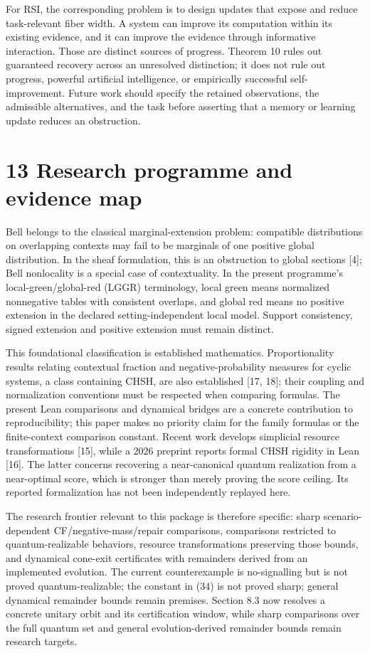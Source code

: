 \documentclass[
]{article}
\begin{document}
For RSI, the corresponding problem is to design updates that expose and reduce task-relevant fiber width. A system can improve its computation within its existing evidence, and it can improve the evidence through informative interaction. Those are distinct sources of progress. Theorem 10 rules out guaranteed recovery across an unresolved distinction; it does not rule out progress, powerful artificial intelligence, or empirically successful self-improvement. Future work should specify the retained observations, the admissible alternatives, and the task before asserting that a memory or learning update reduces an obstruction.

\section{13 Research programme and evidence map}\label{research-programme-and-evidence-map}

Bell belongs to the classical marginal-extension problem: compatible distributions on overlapping contexts may fail to be marginals of one positive global distribution. In the sheaf formulation, this is an obstruction to global sections {[}4{]}; Bell nonlocality is a special case of contextuality. In the present programme's local-green/global-red (LGGR) terminology, local green means normalized nonnegative tables with consistent overlaps, and global red means no positive extension in the declared setting-independent local model. Support consistency, signed extension and positive extension must remain distinct.

This foundational classification is established mathematics. Proportionality results relating contextual fraction and negative-probability measures for cyclic systems, a class containing CHSH, are also established {[}17, 18{]}; their coupling and normalization conventions must be respected when comparing formulas. The present Lean comparisons and dynamical bridges are a concrete contribution to reproducibility; this paper makes no priority claim for the family formulas or the finite-context comparison constant. Recent work develops simplicial resource transformations {[}15{]}, while a 2026 preprint reports formal CHSH rigidity in Lean {[}16{]}. The latter concerns recovering a near-canonical quantum realization from a near-optimal score, which is stronger than merely proving the score ceiling. Its reported formalization has not been independently replayed here.

The research frontier relevant to this package is therefore specific: sharp scenario-dependent CF/negative-mass/repair comparisons, comparisons restricted to quantum-realizable behaviors, resource transformations preserving those bounds, and dynamical cone-exit certificates with remainders derived from an implemented evolution. The current counterexample is no-signalling but is not proved quantum-realizable; the constant in (34) is not proved sharp; general dynamical remainder bounds remain premises. Section 8.3 now resolves a concrete unitary orbit and its certification window, while sharp comparisons over the full quantum set and general evolution-derived remainder bounds remain research targets.
\end{document}
